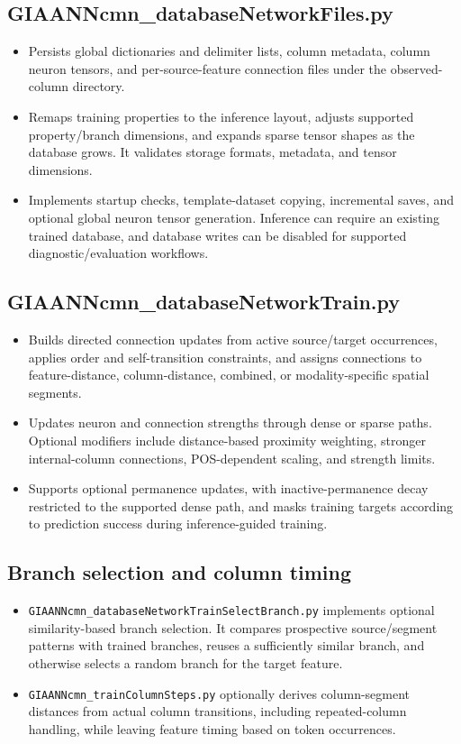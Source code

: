 \subsection{GIAANNcmn\_databaseNetworkFiles.py}
\begin{itemize}
	\item Persists global dictionaries and delimiter lists, column metadata, column neuron tensors, and per-source-feature connection files under the observed-column directory.
	\item Remaps training properties to the inference layout, adjusts supported property/branch dimensions, and expands sparse tensor shapes as the database grows. It validates storage formats, metadata, and tensor dimensions.
	\item Implements startup checks, template-dataset copying, incremental saves, and optional global neuron tensor generation. Inference can require an existing trained database, and database writes can be disabled for supported diagnostic/evaluation workflows.
\end{itemize}

\subsection{GIAANNcmn\_databaseNetworkTrain.py}
\begin{itemize}
	\item Builds directed connection updates from active source/target occurrences, applies order and self-transition constraints, and assigns connections to feature-distance, column-distance, combined, or modality-specific spatial segments.
	\item Updates neuron and connection strengths through dense or sparse paths. Optional modifiers include distance-based proximity weighting, stronger internal-column connections, POS-dependent scaling, and strength limits.
	\item Supports optional permanence updates, with inactive-permanence decay restricted to the supported dense path, and masks training targets according to prediction success during inference-guided training.
\end{itemize}

\subsection{Branch selection and column timing}
\begin{itemize}
	\item \texttt{GIAANNcmn\_databaseNetworkTrainSelectBranch.py} implements optional similarity-based branch selection. It compares prospective source/segment patterns with trained branches, reuses a sufficiently similar branch, and otherwise selects a random branch for the target feature.
	\item \texttt{GIAANNcmn\_trainColumnSteps.py} optionally derives column-segment distances from actual column transitions, including repeated-column handling, while leaving feature timing based on token occurrences.
\end{itemize}

